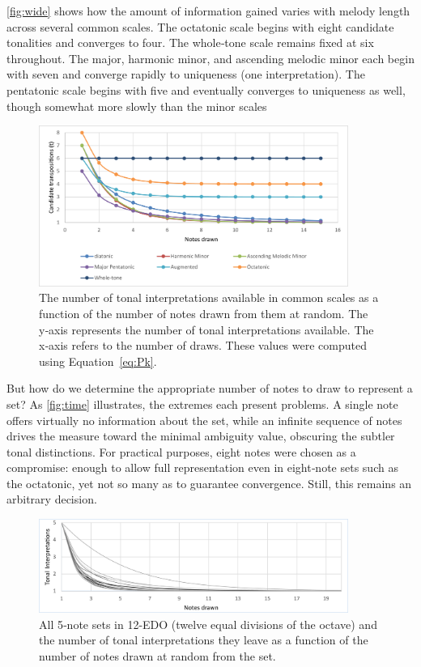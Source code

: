 \documentclass[10pt,twocolumn]{article}
\numberwithin{equation}{section} %
\begin{document}
    \autoref{fig:wide} shows how the amount of information gained varies with melody length across several common scales.
    The octatonic scale begins with eight candidate tonalities and converges to four.
    The whole‑tone scale remains fixed at six throughout.
    The major, harmonic minor, and ascending melodic minor each begin with seven and converge rapidly to uniqueness (one interpretation).
    The pentatonic scale begins with five and eventually converges to uniqueness as well, though somewhat more slowly than the minor scales

    \begin{figure}[htbp]
        \centering
        \includegraphics[width=0.9\textwidth]{transposition-probability.pdf}%
        \caption{The number of tonal interpretations available in common scales as a function of the number of notes drawn from them at random.
        The y‑axis represents the number of tonal interpretations available.
        The x‑axis refers to the number of draws.
        These values were computed using Equation~\ref{eq:Pk}.}
        \label{fig:wide}
    \end{figure}

    But how do we determine the appropriate number of notes to draw to represent a set?
    As \autoref{fig:time} illustrates, the extremes each present problems.
    A single note offers virtually no information about the set, while an infinite sequence of notes drives the measure toward the minimal ambiguity value, obscuring the subtler tonal distinctions.
    For practical purposes, eight notes were chosen as a compromise: enough to allow full representation even in eight‑note sets such as the octatonic, yet not so many as to guarantee convergence.
    Still, this remains an arbitrary decision.

    \begin{figure}[htbp]
        \centering
        \includegraphics[width=0.9\textwidth]{transposition-time.pdf}%
        \caption{All 5‑note sets in 12-EDO (twelve equal divisions of the octave) and the number of tonal interpretations they leave as a function of the number of notes drawn at random from the set.}
        \label{fig:time}
    \end{figure}
\end{document}
